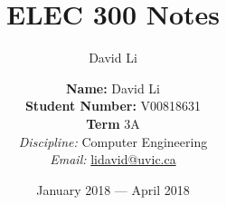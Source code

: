 \documentclass{report}
\title{ELEC 300 Notes}
\author{David Li}
\date{January 2018 --- April 2018}
\theoremstyle{plain}
\theoremstyle{definition}
\theoremstyle{remark}
\begin{document}
	
\makeatletter
\def\printauthor{%
	{\large \@author}}              
\makeatother

\author{%
	\textbf{Name: }  David Li \\
	\textbf{Student Number:} V00818631	\\
	\textbf{Term}  3A  \\
	\textit{Discipline:} Computer Engineering \\  \vspace{4pt}
	\textit{Email:} \href{mailto:lidavid@uvic.ca}{lidavid@uvic.ca}
}

\maketitle
\end{document}
